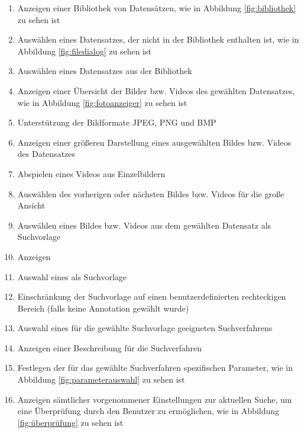\begin{enumerate} [label=\bfseries /F \arabic*0/, leftmargin=*]
	\item Anzeigen einer Bibliothek von Datensätzen, wie in Abbildung \ref{fig:bibliothek} zu sehen ist \label{f:bibliothek_anzeigen}
	\item Auswählen eines Datensatzes, der nicht in der Bibliothek enthalten ist, wie in Abbildung \ref{fig:filedialog} zu sehen ist \label{f:datensatz_hinzufuegen}
	\item Ausw\"ahlen eines Datensatzes aus der Bibliothek \label{f:auswahl_eines_datensatzes}
	\item Anzeigen einer Übersicht der Bilder bzw. Videos des gewählten Datensatzes, wie in Abbildung \ref{fig:fotoanzeiger} zu sehen ist \label{f:uebersicht_anzeigen}
	\item Unterstützung der Bildformate JPEG, PNG und BMP \label{f:bildformate}
	\item Anzeigen einer größeren Darstellung eines ausgewählten Bildes bzw. Videos des Datensatzes \label{f:anzeigen_groessere_darstellung}
	\item Abspielen eines Videos aus Einzelbildern \label{f:video_abspielen}
	\item Auswählen des vorherigen oder nächsten Bildes bzw. Videos für die große Ansicht \label{f:vorheriges_naechstes}
	\item Ausw\"ahlen eines Bildes bzw. Videos aus dem gewählten Datensatz als Suchvorlage \label{f:bildauswahl}
	\item Anzeigen  \label{f:annotation_anzeigen}
	\item Auswahl eines  als Suchvorlage \label{f:annotation_auswaehlen}
	\item Einschränkung der Suchvorlage auf einen benutzerdefinierten rechteckigen Bereich (falls keine \gls{Annotation} gewählt wurde) \label{f:bereich_auswaehlen}
	\item Auswahl eines für die gewählte Suchvorlage geeigneten Suchverfahrens \label{f:auswahl_suchverfahren}
	\item Anzeigen einer Beschreibung für die Suchverfahren \label{f:beschreibung_suchverfahren}
	\item Festlegen der für das gewählte Suchverfahren spezifischen Parameter, wie in Abbildung \ref{fig:parameterauswahl} zu sehen ist \label{f:parameterwahl}
	\item Anzeigen sämtlicher vorgenommener Einstellungen zur aktuellen Suche, um eine Überprüfung durch den Benutzer zu ermöglichen, wie in Abbildung \ref{fig:überprüfung} zu sehen ist \label{f:ueberpruefung}

\end{enumerate}
